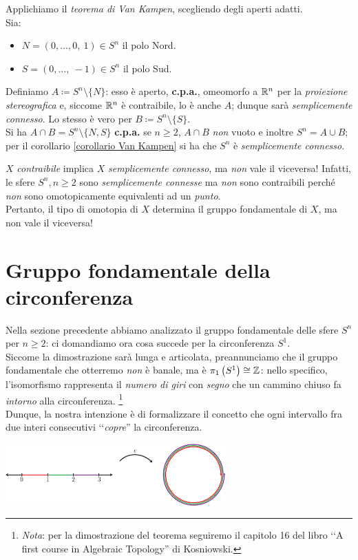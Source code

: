 \begin{demonstration}
	Applichiamo il \textit{teorema di Van Kampen}, scegliendo degli aperti adatti.\\
	Sia:
	\begin{itemize}
		\item $N=(0,\dots,0,\ 1)\in S^n$ il polo Nord.
		\item $S=(0,\dots,\ -1)\in S^n$ il polo Sud.
	\end{itemize}
	Definiamo $A\coloneqq S^n\setminus\{N\}$: esso è aperto, \textbf{c.p.a.}, omeomorfo a $\mathbb{R}^n$ per la \textit{proiezione stereografica} e, siccome $\mathbb{R}^n$ è contraibile, lo è anche $A$; dunque sarà \textit{semplicemente connesso}. Lo stesso è vero per $B\coloneqq S^n\setminus\{S\}$.\\
	Si ha $A\cap B=S^n\setminus\{N, S\}$ \textbf{c.p.a.} se $n\geq 2$, $A\cap B$ \textit{non} vuoto e inoltre $S^n=A\cup B$; per il corollario \ref{corollario Van Kampen} si ha che $S^n$ è \textit{semplicemente connesso}.
\end{demonstration}

\begin{attention}
	$X$ \textit{contraibile} implica $X$ \textit{semplicemente connesso}, ma \textit{non} vale il viceversa! Infatti, le sfere $S^n, n\geq 2$ sono \textit{semplicemente connesse} ma \textit{non} sono contraibili perché \textit{non} sono omotopicamente equivalenti ad un \textit{punto}.\\
	Pertanto, il tipo di omotopia di $X$ determina il gruppo fondamentale di $X$, ma non vale il viceversa!
\end{attention}

\section{Gruppo fondamentale della circonferenza}
Nella sezione precedente abbiamo analizzato il gruppo fondamentale delle sfere $S^n$ per $n\geq 2$: ci domandiamo ora cosa succede per la circonferenza $S^1$. \\
Siccome la dimostrazione sarà lunga e articolata, preannunciamo che il gruppo fondamentale che otterremo \textit{non} è banale, ma è $\gruf{S^1}{\ }\cong \integerset$: nello specifico, l'isomorfismo rappresenta il \textit{numero di giri} con \textit{segno} che un cammino chiuso fa \textit{intorno} alla circonferenza. \footnote{\textit{Nota}: per la dimostrazione del teorema seguiremo il capitolo 16 del libro ‘‘A first course in Algebraic Topology'' di Kosniowski.} \\
Dunque, la nostra intenzione è di formalizzare il concetto che ogni intervallo fra due interi consecutivi ‘‘\textit{copre}'' la circonferenza.
\begin{center}
	\includegraphics[width=240pt]{images/slinky-eps-converted-to.pdf}
\end{center}
